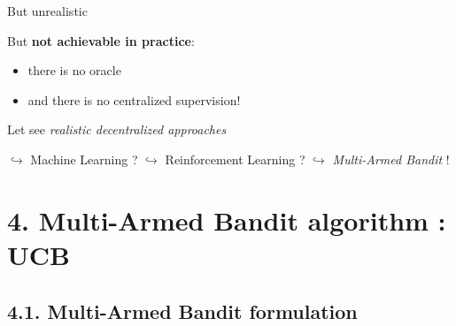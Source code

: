 \begin{frameO}

    \begin{colorblock}{But unrealistic}

        But \textbf{not achievable in practice}:
        \begin{itemize}
            \item
            there is no oracle
            \item
            and there is no centralized supervision!
        \end{itemize}

    \end{colorblock}

    \begin{colorblock}{Let see \emph{realistic decentralized approaches}}

        \(\hookrightarrow\) Machine Learning ? \newline
        \hspace*{15pt}\(\hookrightarrow\) Reinforcement Learning ? \newline
        \hspace*{30pt} \(\hookrightarrow\) \emph{Multi-Armed Bandit} !

    \end{colorblock}

\end{frameO}



\section{\hfill{}4. Multi-Armed Bandit algorithm : UCB\hfill{}}

\subsection{\hfill{}4.1. Multi-Armed Bandit formulation\hfill{}}


